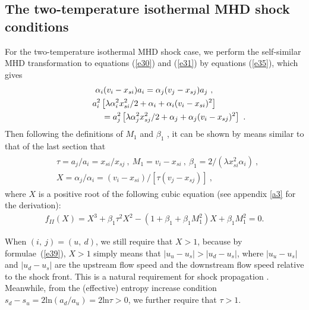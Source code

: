 \documentclass[fleqn,usenatbib]{mnras}
\begin{document}
\subsection{The two-temperature isothermal MHD shock conditions}
\label{s3.2}
For the two-temperature isothermal MHD shock case, we perform the self-similar MHD transformation to equations (\ref{e30}) and (\ref{e31}) by equations (\ref{e35}), which gives
\begin{gather}
\alpha_{i}(v_{i}-x_{si})a_{i}=\alpha_{j}(v_{j}-x_{sj})a_{j}\ ,\\
a^{2}_{i}\left[ \lambda \alpha_{i}^{2} x_{si}^{2}/2+\alpha_{i}+\alpha_{i}(v_{i}-x_{si})^{2}\right]\notag\\
 \qquad\qquad \quad =a^{2}_{j}\left[ \lambda \alpha_{j}^{2}
 x_{sj}^{2}/2+\alpha_{j}+\alpha_{j}(v_{i}-x_{sj})^{2}\right]\ .
 \label{e38}
\end{gather}
Then following the definitions of $M_{1}$ and $\beta_{1}$ , it can be shown by means similar to that of the last section that
\begin{gather}
\begin{split}
&\tau=a_{j}/a_{i}=x_{si}/x_{sj}\ ,
\ M_{1}=v_{i}-x_{si}\ ,
\ \beta_{1}=2/(\lambda x^{2}_{si}\alpha_{i})\ ,\\
&X=\alpha_{j}/\alpha_{i}=(v_{i}-x_{si})/[\tau (v_{j}-x_{sj})]\ ,
\end{split}\label{e39}
\end{gather}
where $X$ is a positive root of the following cubic equation (see appendix \ref{a3} for the derivation):
\begin{gather}
f_{II}(X)=X^{3}+\beta_{1}\tau^{2} X^{2}
 -(1+\beta_{1}
 +\beta_{1} M_{1}^{2}) X+\beta_{1}M_{1}^{2}=0. \label{e40}
\end{gather}

When $(i,\ j)=(u,\ d)$, we still require that $X>1$, because by formulae~(\ref{e39}), $X>1$ simply means that $|u_{u}-u_{s}|>|u_{d}-u_{s}|$, where $|u_{u}-u_{s}|$ and $|u_{d}-u_{s}|$ are the upstream flow speed and the downstream flow speed relative to the shock front. This is a natural requirement for shock propagation \citep{FM}. Meanwhile, from the (effective) entropy increase condition $s_{d}-s_{u}=2\mathrm{ln}(a_{d}/a_{u})=2\mathrm{ln}\tau>0$, we further require that $\tau>1$. 
\end{document}

